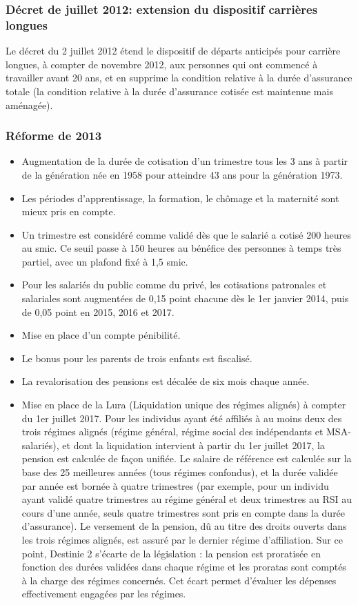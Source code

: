 \subsubsection{Décret de juillet 2012: extension du dispositif carrières longues}

Le décret du 2 juillet 2012 étend le dispositif de départs anticipés pour carrière longues, à compter de novembre 2012, aux personnes qui ont commencé à travailler avant 20 ans, et en supprime la condition relative à la durée d'assurance totale (la condition relative à la durée d'assurance cotisée est maintenue mais aménagée).

\subsubsection{Réforme de 2013}
\begin{itemize}
   \item Augmentation de la durée de cotisation d'un trimestre tous les 3 ans à partir de la génération née en 1958 pour atteindre 43 ans pour la génération 1973.
   \item Les périodes d'apprentissage, la formation, le chômage et la maternité sont mieux pris en compte.
   \item Un trimestre est considéré comme validé dès que le salarié a cotisé 200 heures au smic. Ce seuil passe à 150 heures au bénéfice des personnes à temps très partiel, avec un plafond fixé à 1,5 smic.
   \item Pour les salariés du public comme du privé, les cotisations patronales et salariales sont augmentées de 0,15 point chacune dès le 1er janvier 2014, puis de 0,05 point en 2015, 2016 et 2017.
   \item Mise en place d'un compte pénibilité.
   \item Le bonus pour les parents de trois enfants est fiscalisé.
   \item La revalorisation des pensions est décalée de six mois chaque année.
   \item Mise en place de la Lura (Liquidation unique des régimes alignés) à compter du 1er juillet 2017. Pour les individus ayant été affiliés à au moins deux des trois régimes alignés (régime général, régime social des indépendants et MSA-salariés), et dont la liquidation intervient à partir du 1er juillet 2017, la pension est calculée de façon unifiée. Le salaire de référence est calculée sur la base des 25 meilleures années (tous régimes confondus), et la durée validée par année est bornée à quatre trimestres (par exemple, pour un individu ayant validé quatre trimestres au régime général et deux trimestres au RSI au cours d'une année, seuls quatre trimestres sont pris en compte dans la durée d'assurance). Le versement de la pension, dû au titre des droits ouverts dans les trois régimes alignés, est assuré par le dernier régime d’affiliation. Sur ce point, Destinie 2 s'écarte de la législation : la pension est proratisée en fonction des durées validées dans chaque régime et les proratas sont comptés à la charge des régimes concernés. Cet écart permet d'évaluer les dépenses effectivement engagées par les régimes.
\end{itemize}

